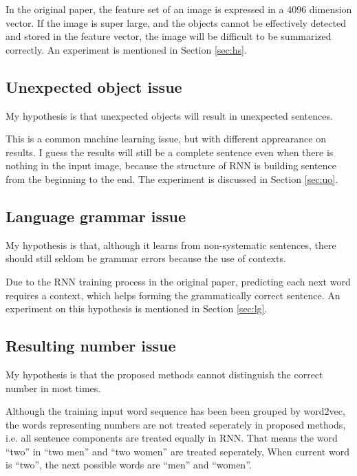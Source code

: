 \documentclass[10pt,twocolumn,letterpaper]{article}
\begin{document}
In the original paper, the feature set of an image is expressed in a 4096 dimension vector.
If the image is super large, and the objects cannot be effectively detected and stored in the feature vector,
the image will be difficult to be summarized correctly. An experiment is mentioned in Section \ref{sec:hs}.


\subsection{Unexpected object issue}
My hypothesis is that unexpected objects will result in unexpected sentences.

This is a common machine learning issue, but with different apprearance on results.
I guess the results will still be a complete sentence even when there is nothing in the input image,
because the structure of RNN is building sentence from the beginning to the end.
The experiment is discussed in Section \ref{sec:uo}.


\subsection{Language grammar issue}

My hypothesis is that, although it learns from non-systematic sentences,
there should still seldom be grammar errors because the use of contexts.

Due to the RNN training process in the original paper, predicting each next word requires a context,
which helps forming the grammatically correct sentence.
An experiment on this hypothesis is mentioned in Section \ref{sec:lg}.


\subsection{Resulting number issue}
My hypothesis is that the proposed methods cannot distinguish the correct number in most times.

Although the training input word sequence has been been grouped by word2vec,
the words representing numbers are not treated seperately in proposed methods,
i.e. all sentence components are treated equally in RNN.
That means the word ``two'' in ``two men'' and ``two women'' are treated seperately,
When current word is ``two'', the next possible words are ``men'' and ``women''.
\end{document}

